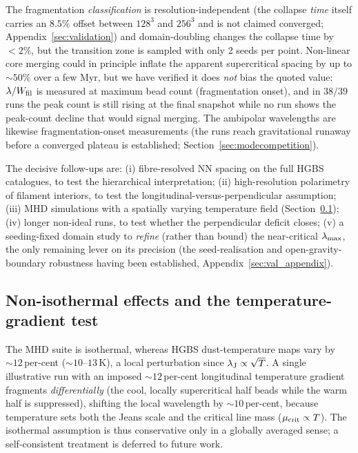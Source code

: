 \documentclass[usenatbib,twoside,twocolumn]{mnras}
\begin{document}
The fragmentation \emph{classification} is resolution-independent (the collapse \emph{time} itself carries an $8.5\%$ offset between $128^3$ and $256^3$ and is not claimed converged; Appendix~\ref{sec:validation}) and domain-doubling changes the collapse time by $<2\%$, but the transition zone is sampled with only 2 seeds per point. Non-linear core merging could in principle inflate the apparent supercritical spacing by up to $\sim50\%$ over a few Myr, but we have verified it does \emph{not} bias the quoted value: $\lambda/W_{\rm fil}$ is measured at maximum bead count (fragmentation onset), and in $38/39$ runs the peak count is still rising at the final snapshot while no run shows the peak-count decline that would signal merging. The ambipolar wavelengths are likewise fragmentation-onset measurements (the runs reach gravitational runaway before a converged plateau is established; Section~\ref{sec:modecompetition}).

The decisive follow-ups are: (i) fibre-resolved NN spacing on the full HGBS catalogues, to test the hierarchical interpretation; (ii) high-resolution polarimetry of filament interiors, to test the longitudinal-versus-perpendicular assumption; (iii) MHD simulations with a spatially varying temperature field (Section~\ref{sec:mt_variation}); (iv) longer non-ideal runs, to test whether the perpendicular deficit closes; (v) a seeding-fixed domain study to \emph{refine} (rather than bound) the near-critical $\lambda_{\rm max}$, the only remaining lever on its precision (the seed-realisation and open-gravity-boundary robustness having been established, Appendix~\ref{sec:val_appendix}).


\subsection{Non-isothermal effects and the temperature-gradient test}
\label{sec:mt_variation}

The MHD suite is isothermal, whereas HGBS dust-temperature maps vary by $\sim12$\,per-cent ($\sim10$--$13$\,K), a local perturbation since $\lambda_{\rm J}\propto\sqrt{T}$. A single illustrative run with an imposed $\sim12$\,per-cent longitudinal temperature gradient fragments \emph{differentially} (the cool, locally supercritical half beads while the warm half is suppressed), shifting the local wavelength by $\sim10$\,per-cent, because temperature sets both the Jeans scale and the critical line mass ($\mu_{\rm crit}\propto T$). The isothermal assumption is thus conservative only in a globally averaged sense; a self-consistent treatment is deferred to future work.
\end{document}
